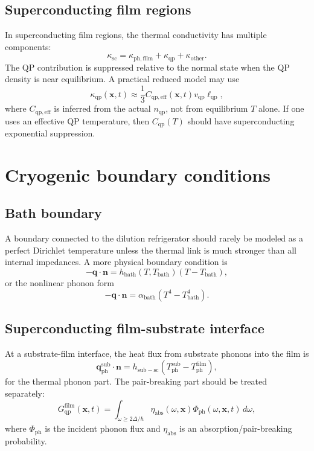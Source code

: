 \documentclass[11pt]{article}
\newcommand{\Tph}{T_{\mathrm{ph}}}
\newcommand{\Tbath}{T_{\mathrm{bath}}}
\newcommand{\kappaqp}{\kappa_{\mathrm{qp}}}
\newcommand{\nqp}{n_{\mathrm{qp}}}
\newcommand{\x}{\mathbf{x}}
\newcommand{\Jq}{\mathbf{q}}
\newcommand{\Jph}{\mathbf{q}_{\mathrm{ph}}}
\newcommand{\nvecb}{\mathbf{n}}
\begin{document}
\subsection{Superconducting film regions}

In superconducting film regions, the thermal conductivity has multiple components:
\begin{equation}
\kappa_{\mathrm{sc}} = \kappa_{\mathrm{ph,film}} + \kappa_{\mathrm{qp}} + \kappa_{\mathrm{other}}.
\end{equation}
The QP contribution is suppressed relative to the normal state when the QP density is near equilibrium. A practical reduced model may use
\begin{equation}
\kappaqp(\x,t) \approx \frac{1}{3} C_{\mathrm{qp,eff}}(\x,t)v_{\mathrm{qp}}\ell_{\mathrm{qp}},
\end{equation}
where \(C_{\mathrm{qp,eff}}\) is inferred from the actual \(\nqp\), not from equilibrium \(T\) alone. If one uses an effective QP temperature, then \(C_{\mathrm{qp}}(T)\) should have superconducting exponential suppression.

\section{Cryogenic boundary conditions}

\subsection{Bath boundary}

A boundary connected to the dilution refrigerator should rarely be modeled as a perfect Dirichlet temperature unless the thermal link is much stronger than all internal impedances. A more physical boundary condition is
\begin{equation}
-\Jq\cdot\nvecb = h_{\mathrm{bath}}(T,\Tbath)(T-\Tbath),
\label{eq:bath_robin}
\end{equation}
or the nonlinear phonon form
\begin{equation}
-\Jq\cdot\nvecb = \alpha_{\mathrm{bath}}(T^4-\Tbath^4).
\end{equation}

\subsection{Superconducting film-substrate interface}

At a substrate-film interface, the heat flux from substrate phonons into the film is
\begin{equation}
\Jph^{\mathrm{sub}}\cdot\nvecb = h_{\mathrm{sub-sc}}(\Tph^{\mathrm{sub}}-\Tph^{\mathrm{film}}),
\label{eq:sub_sc_interface}
\end{equation}
for the thermal phonon part. The pair-breaking part should be treated separately:
\begin{equation}
G_{\mathrm{qp}}^{\mathrm{film}}(\x,t)
= \int_{\omega\ge2\Delta/\hbar}
\eta_{\mathrm{abs}}(\omega,\x)\Phi_{\mathrm{ph}}(\omega,\x,t)\,d\omega,
\label{eq:Gqp_pair_breaking_flux}
\end{equation}
where \(\Phi_{\mathrm{ph}}\) is the incident phonon flux and \(\eta_{\mathrm{abs}}\) is an absorption/pair-breaking probability.
\end{document}
